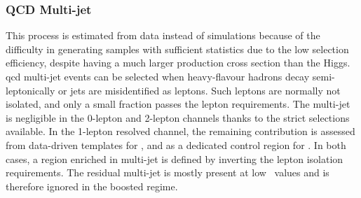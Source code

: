 \subsubsection{QCD Multi-jet}
This process is estimated from data instead of simulations because of the difficulty in generating samples with sufficient statistics due to the low selection efficiency, despite having a much larger production cross section than the Higgs. \gls{qcd} multi-jet events can be selected when heavy-flavour hadrons decay semi-leptonically or jets are misidentified as leptons. Such leptons are normally not isolated, and only a small fraction passes the lepton requirements. The multi-jet is negligible in the 0-lepton and 2-lepton channels thanks to the strict selections available. In the 1-lepton resolved channel, the remaining contribution is assessed from data-driven templates for \vhb, and as a dedicated control region for \vhc. In both cases, a region enriched in multi-jet is defined by inverting the lepton isolation requirements. The residual multi-jet is mostly present at low \ptv\ values and is therefore ignored in the boosted regime.

